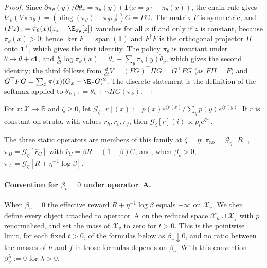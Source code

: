\begin{proof}
Since $\partial\pi_\theta(y)/\partial\theta_x=\pi_\theta(y)(\mathbf 1\{x=y\}-\pi_\theta(x))$,
the chain rule gives
$\nabla_\theta(V\circ\pi_\theta)=(\operatorname{diag}(\pi_\theta)-\pi_\theta\pi_\theta^\top)G=F G$.
The matrix $F$ is symmetric, and $(Fz)_x=\pi_\theta(x)(z_x-\E_{\pi_\theta}[z])$
vanishes for all $x$ if and only if $z$ is constant, because $\pi_\theta(x)>0$;
hence $\ker F=\operatorname{span}(\mathbf 1)$ and $F^\dagger F$ is the
orthogonal projector $\Pi$ onto $\mathbf 1^{\perp}$, which gives the first
identity. The policy $\pi_\theta$ is invariant under
$\theta\mapsto\theta+c\mathbf 1$, and
$\frac{d}{dt}\log\pi_\theta(x)=\dot\theta_x-\sum_y\pi_\theta(y)\dot\theta_y$,
which gives the second identity; the third follows from
$\frac{d}{dt}V=(FG)^\top\Pi G=G^\top F G$ (as $F\Pi=F$) and
$G^\top FG=\sum_x\pi(x)(G_x-\E_\pi G)^2$. The discrete statement is the
definition of the softmax applied to $\theta_{k+1}=\theta_k+\gamma\Pi G(\pi_k)$.
\end{proof}

\begin{definition}\label{def:gibbs-family}
For $r:\mathcal X\to\mathbb R$ and $\zeta\ge 0$, let
$\mathcal G_\zeta[r](x):=p(x)e^{\zeta r(x)}/\sum_y p(y)e^{\zeta r(y)}$.
If $r$ is constant on strata, with values $r_h,r_v,r_f$, then
$\mathcal G_\zeta[r](i)\propto p_i e^{\zeta r_i}$.
\end{definition}

The three static operators are members of this family at $\zeta=\eta$:
$\pi_{\mathrm{no}}=\mathcal G_\eta[R]$,
$\pi_B=\mathcal G_\eta[\bar r_C]$ with
$\bar r_C=\beta R-(1-\beta)C$, and, when $\beta_v>0$,
$\pi_A=\mathcal G_\eta[R+\eta^{-1}\log\beta]$.

\paragraph{Convention for $\beta_v=0$ under operator~A.}
When $\beta_v=0$ the effective reward $R+\eta^{-1}\log\beta$ equals
$-\infty$ on $\mathcal X_v$. We then define every object attached to
operator~A on the reduced space $\mathcal X_h\cup\mathcal X_f$ with $p$
renormalised, and set the mass of $\mathcal X_v$ to zero for $t>0$. This is
the pointwise limit, for each fixed $t>0$, of the formulas below as
$\beta_v\downarrow 0$, and no ratio between the masses of $h$ and $f$ in
those formulas depends on $\beta_v$. With this convention $\beta_v^{\lambda}:=0$
for $\lambda>0$.

